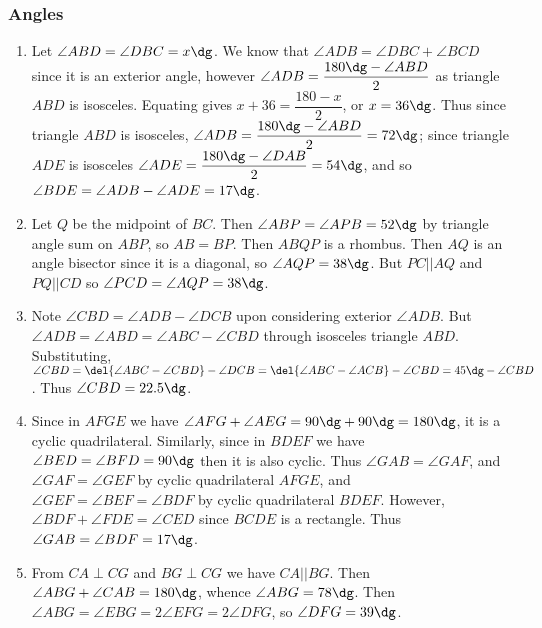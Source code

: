 \documentclass[10pt,paper=letter]{scrartcl}
\begin{document}
\subsubsection*{Angles}

\begin{enumerate}

\item Let $\angle ABD = \angle DBC = x\dg$. We know that $\angle ADB = \angle DBC + \angle BCD$ since it is an exterior angle, however $\angle ADB = \dfrac{180\dg - \angle ABD}2$ as triangle $ABD$ is isosceles. Equating gives $x + 36 = \dfrac{180 - x}2$, or $x = 36\dg$. Thus since triangle $ABD$ is isosceles, $\angle ADB = \dfrac{180\dg - \angle ABD}2 = 72\dg$; since triangle $ADE$ is isosceles $\angle ADE = \dfrac{180\dg - \angle DAB}2 = 54\dg$, and so $\angle BDE = \angle ADB - \angle ADE = 17\dg$.

\item Let $Q$ be the midpoint of $BC$. Then $\angle ABP = \angle APB = 52\dg$ by triangle angle sum on $ABP$, so $AB = BP$. Then $ABQP$ is a rhombus. Then $AQ$ is an angle bisector since it is a diagonal, so $\angle AQP = 38\dg$. But $PC || AQ$ and $PQ || CD$ so $\angle PCD = \angle AQP = 38\dg$.

\item Note $\angle CBD = \angle ADB - \angle DCB$ upon considering exterior $\angle ADB$. But $\angle ADB = \angle ABD = \angle ABC - \angle CBD$ through isosceles triangle $ABD$. Substituting, $\angle CBD = \del{\angle ABC - \angle CBD} - \angle DCB = \del{\angle ABC - \angle ACB} - \angle CBD = 45\dg - \angle CBD$. Thus $\angle CBD = 22.5\dg$.

\item Since in $AFGE$ we have $\angle AFG + \angle AEG = 90\dg + 90\dg = 180\dg$, it is a cyclic quadrilateral. Similarly, since in $BDEF$ we have $\angle BED = \angle BFD = 90\dg$ then it is also cyclic. Thus $\angle GAB = \angle GAF$, and $\angle GAF = \angle GEF$ by cyclic quadrilateral $AFGE$, and $\angle GEF = \angle BEF = \angle BDF$ by cyclic quadrilateral $BDEF$. However, $\angle BDF + \angle FDE = \angle CED$ since $BCDE$ is a rectangle. Thus $\angle GAB = \angle BDF = 17\dg$.

\item From $CA \perp CG$ and $BG \perp CG$ we have $CA || BG$. Then $\angle ABG + \angle CAB = 180\dg$, whence $\angle ABG = 78\dg$. Then $\angle ABG = \angle EBG = 2\angle EFG = 2\angle DFG$, so $\angle DFG = 39\dg$.

\end{enumerate}
\end{document}
